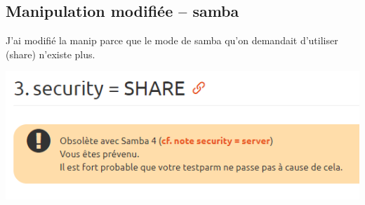 \documentclass[a4paper]{article}
\begin{document}
\subsection{Manipulation modifiée -- samba}





J'ai modifié la manip parce que le mode de samba qu'on demandait d'utiliser (share) n'existe plus.

\begin{center}
    \includegraphics[width=0.65\linewidth]{images/003.PNG}
\end{center}
\end{document}
